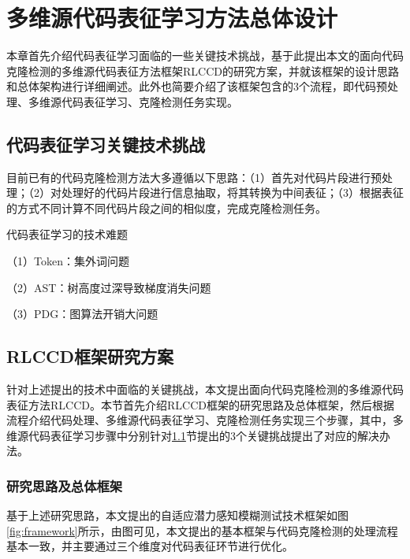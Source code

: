 \chapter{多维源代码表征学习方法总体设计}

本章首先介绍代码表征学习面临的一些关键技术挑战，基于此提出本文的面向代码克隆检测的多维源代码表征方法框架RLCCD的研究方案，并就该框架的设计思路和总体架构进行详细阐述。此外也简要介绍了该框架包含的3个流程，即代码预处理、多维源代码表征学习、克隆检测任务实现。

\section{代码表征学习关键技术挑战}
\label{challenges}

目前已有的代码克隆检测方法大多遵循以下思路：（1）首先对代码片段进行预处理；（2）对处理好的代码片段进行信息抽取，将其转换为中间表征；（3）根据表征的方式不同计算不同代码片段之间的相似度，完成克隆检测任务。


代码表征学习的技术难题

（1）Token：集外词问题

（2）AST：树高度过深导致梯度消失问题

（3）PDG：图算法开销大问题


\section{RLCCD框架研究方案}
针对上述提出的技术中面临的关键挑战，本文提出面向代码克隆检测的多维源代码表征方法RLCCD。本节首先介绍RLCCD框架的研究思路及总体框架，然后根据流程介绍代码处理、多维源代码表征学习、克隆检测任务实现三个步骤，其中，多维源代码表征学习步骤中分别针对\ref{challenges}节提出的3个关键挑战提出了对应的解决办法。

\subsection{研究思路及总体框架}

基于上述研究思路，本文提出的自适应潜力感知模糊测试技术框架如图\ref{fig:framework}所示，由图可见，本文提出的基本框架与代码克隆检测的处理流程基本一致，并主要通过三个维度对代码表征环节进行优化。

